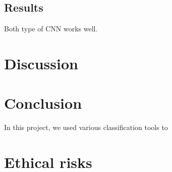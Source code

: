 \documentclass[10pt,conference,compsocconf]{IEEEtran}
\begin{document}
\subsection{Results}
Both type of CNN works well.

\section{Discussion}
\label{sec:discussion}

\section{Conclusion}
\label{sec:conclusion}
In this project, we used various classification tools to

\newpage
\section{Ethical risks}


\end{document}
